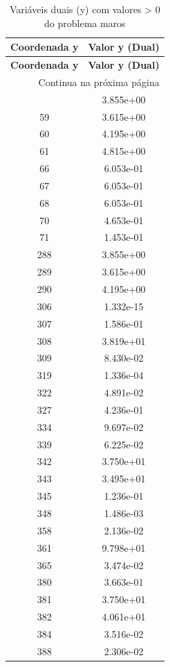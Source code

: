 \documentclass[12pt]{article}
\begin{document}
\begin{longtable}{@{}cc@{}}
\caption{Variáveis duais (y) com valores > 0 do problema maros} \\
\toprule
\textbf{Coordenada y} & \textbf{Valor y (Dual)} \\
\midrule
\endfirsthead

\toprule
\textbf{Coordenada y} & \textbf{Valor y (Dual)} \\
\midrule
\endhead

\midrule \multicolumn{2}{r}{{Continua na próxima página}} \\ \midrule
\endfoot

\bottomrule
\endlastfoot
58 & 3.855e+00 \\
59 & 3.615e+00 \\
60 & 4.195e+00 \\
61 & 4.815e+00 \\
66 & 6.053e-01 \\
67 & 6.053e-01 \\
68 & 6.053e-01 \\
70 & 4.653e-01 \\
71 & 1.453e-01 \\
288 & 3.855e+00 \\
289 & 3.615e+00 \\
290 & 4.195e+00 \\
306 & 1.332e-15 \\
307 & 1.586e-01 \\
308 & 3.819e+01 \\
309 & 8.430e-02 \\
319 & 1.336e-04 \\
322 & 4.891e-02 \\
327 & 4.236e-01 \\
334 & 9.697e-02 \\
339 & 6.225e-02 \\
342 & 3.750e+01 \\
343 & 3.495e+01 \\
345 & 1.236e-01 \\
348 & 1.486e-03 \\
358 & 2.136e-02 \\
361 & 9.798e+01 \\
365 & 3.474e-02 \\
380 & 3.663e-01 \\
381 & 3.750e+01 \\
382 & 4.061e+01 \\
384 & 3.516e-02 \\
388 & 2.306e-02 \\

\end{longtable}
\end{document}
